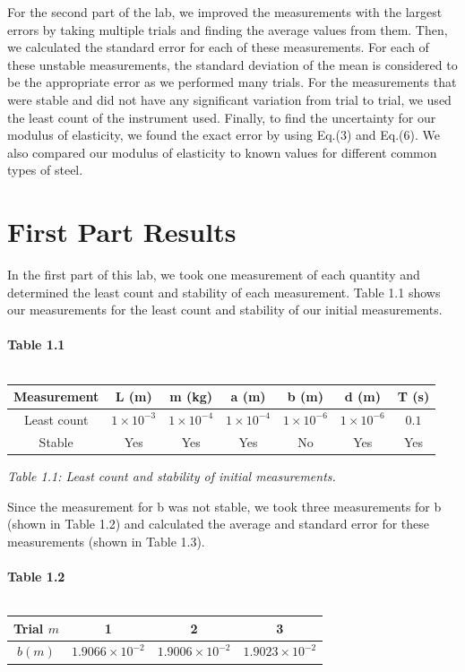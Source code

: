 \documentclass[leqno]{article}
\begin{document}
For the second part of the lab, we improved the measurements with the largest errors by taking multiple trials and finding the average values from them.  Then, we calculated the standard error for each of these measurements.  For each of these unstable measurements, the standard deviation of the mean is considered to be the appropriate error as we performed many trials.  For the measurements that were stable and did not have any significant variation from trial to trial, we used the least count of the instrument used.  Finally, to find the uncertainty for our modulus of elasticity, we found the exact error by using Eq.(3) and Eq.(6).  We also compared our modulus of elasticity to known values for different common types of steel. 
\section*{First Part Results}
In the first part of this lab, we took one measurement of each quantity and determined the least count and stability of each measurement.  Table 1.1 shows our measurements for the least count and stability of our initial measurements.\\\\
\textbf{Table 1.1}\\\\
\begin{tabular}{|c|c|c|c|c|c|c|}
	\hline
	Measurement & L (m)& m (kg)& a (m)& b (m)& d (m)& T (s)\\
	\hline
	Least count & $1 \times 10^{-3}$ & $1\times 10^{-4}$ & $1 \times 10^{-4}$ & $1 \times 10^{-6}$ & $1 \times 10^{-6}$ & $0.1$\\
	\hline
	Stable & Yes & Yes & Yes & No & Yes & Yes\\
	\hline
\end{tabular}
\begin{flushleft}
\textit{\small Table 1.1: Least count and stability of initial measurements.}
\end{flushleft}
Since the measurement for b was not stable, we took three measurements for b (shown in Table 1.2) and calculated the average and standard error for these measurements (shown in Table 1.3).\\\\
\textbf{Table 1.2}\\\\
\begin{tabular}{|c|c|c|c|}
	\hline
	Trial $m$ & 1 & 2 & 3\\
	\hline
	$b (m)$ & $1.9066 \times 10^{-2}$ & $1.9006 \times 10^{-2}$ & $1.9023 \times 10^{-2}$\\
	\hline
\end{tabular}
\end{document}
